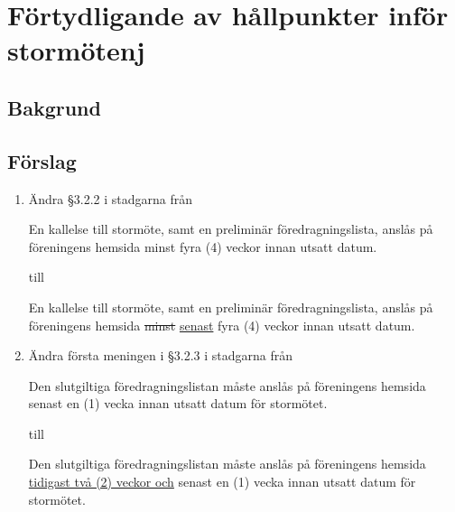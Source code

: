 \documentclass[12pt,a4paper]{article}
\newenvironment{quotationb}%
{\begin{leftbar}}%
{\end{leftbar}}
\newcommand{\thedate}{\today}
\begin{document}
\pagestyle{fancy}
\rhead{Proposition\\Linköping \thedate\\\phantom{}}

\hspace{20em}


\section{Förtydligande av hållpunkter inför stormötenj}

\subsection{Bakgrund}


\subsection{Förslag}


\begin{enumerate}
    \item Ändra \S{}3.2.2 i stadgarna från 

    \begin{quotationb}
        En kallelse till stormöte, samt en preliminär föredragningslista, anslås
        på föreningens hemsida minst fyra (4) veckor innan utsatt datum.
    \end{quotationb}

    till

    \begin{quotationb}
        En kallelse till stormöte, samt en preliminär föredragningslista, anslås
        på föreningens hemsida \sout{minst} \underline{senast} fyra (4) veckor
        innan utsatt datum.
    \end{quotationb}

    \item Ändra första meningen i \S{}3.2.3 i stadgarna från

    \begin{quotationb}
        Den slutgiltiga föredragningslistan måste anslås på föreningens hemsida
        senast en (1) vecka innan utsatt datum för stormötet.
    \end{quotationb}

    till 

    \begin{quotationb}
        Den slutgiltiga föredragningslistan måste anslås på föreningens hemsida
        \underline{tidigast två (2) veckor och} senast en (1) vecka innan utsatt datum för stormötet.
    \end{quotationb}

\end{enumerate}
\end{document}
